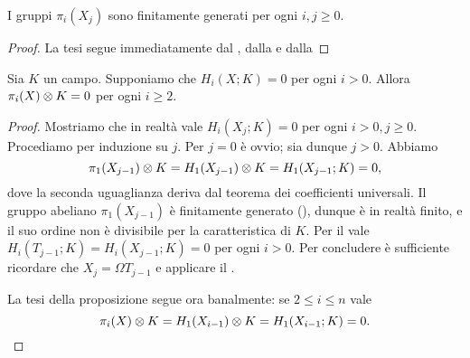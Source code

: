 \begin{corollary}
I gruppi $\pi_i(X_j)$ sono finitamente generati per ogni $i,j\ge 0$.
\end{corollary}
\begin{proof}
La tesi segue immediatamente dal , dalla  e dalla 
\end{proof}

\begin{proposition}
Sia $K$ un campo. Supponiamo che $H_i(X;K)=0$ per ogni $i>0$. Allora $\pi_i(X)\mathbin{\otimes} K=0$ per ogni $i\ge 2$.
\end{proposition}
\begin{proof}
Mostriamo che in realtà vale $H_i(X_j;K)=0$ per ogni $i>0,j\ge 0$. Procediamo per induzione su $j$. Per $j=0$ è ovvio; sia dunque $j>0$. Abbiamo
$$
\pi_1(X_{j-1})\mathbin{\otimes} K=H_1(X_{j-1})\mathbin{\otimes} K=H_1(X_{j-1};K)=0,
$$
dove la seconda uguaglianza deriva dal teorema dei coefficienti universali. Il gruppo abeliano $\pi_1(X_{j-1})$ è finitamente generato (), dunque è in realtà finito, e il suo ordine non è divisibile per la caratteristica di $K$. Per il  vale $H_i(T_{j-1};K)=H_i(X_{j-1};K)=0$ per ogni $i>0$. Per concludere è sufficiente ricordare che $X_j=\Omega T_{j-1}$ e applicare il .

La tesi della proposizione segue ora banalmente: se $2\le i\le n$ vale
$$
\pi_i(X)\mathbin{\otimes} K=H_1(X_{i-1})\mathbin{\otimes} K=H_1(X_{i-1};K)=0.
$$
\end{proof}

